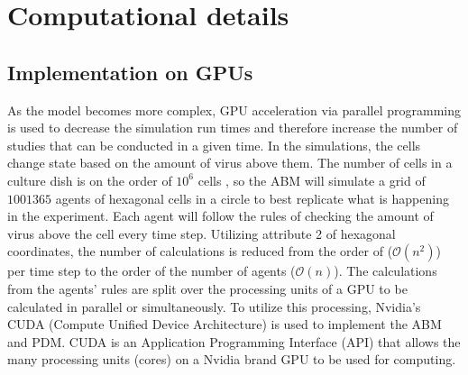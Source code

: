
\section{Computational details}

\subsection{Implementation on GPUs}

As the model becomes more complex, GPU acceleration via parallel programming is used to decrease the simulation run times and therefore increase the number of studies that can be conducted in a given time. In the simulations, the cells change state based on the amount of virus above them. The number of cells in a culture dish is on the order of $10^6$ cells \citep{Number_of_cells_in_a_dish_noauthor_useful_nodate}, so the ABM will simulate a grid of $1001365$ agents of hexagonal cells in a circle to best replicate what is happening in the experiment. Each agent will follow the rules of checking the amount of virus above the cell every time step. Utilizing attribute 2 of hexagonal coordinates, the number of calculations is reduced from the order of ($\mathcal{O}(n^2)$) per time step to the order of the number of agents ($\mathcal{O}(n)$). The calculations from the agents' rules are split over the processing units of a GPU to be calculated in parallel or simultaneously. To utilize this processing, Nvidia's CUDA (Compute Unified Device Architecture) is used to implement the ABM and PDM. CUDA is an Application Programming Interface (API) that allows the many processing units (cores) on a Nvidia brand GPU to be used for computing. %



